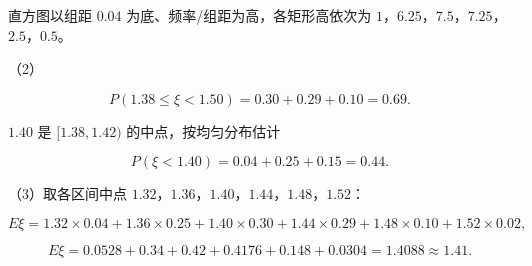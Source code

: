 \begin{answer}
直方图以组距 $0.04$ 为底、频率/组距为高，各矩形高依次为 $1$，$6.25$，$7.5$，$7.25$，$2.5$，$0.5$。

（2）

\nopagebreak[4]
\[P(1.38\leqslant\xi<1.50)=0.30+0.29+0.10=0.69.\]

$1.40$ 是 $[1.38,1.42)$ 的中点，按均匀分布估计

\nopagebreak[4]
\[P(\xi<1.40)=0.04+0.25+0.15=0.44.\]

（3）取各区间中点 $1.32$，$1.36$，$1.40$，$1.44$，$1.48$，$1.52$：

\nopagebreak[4]
\[E\xi=1.32\times0.04+1.36\times0.25+1.40\times0.30+1.44\times0.29+1.48\times0.10+1.52\times0.02,\]

\nopagebreak[4]
\[E\xi=0.0528+0.34+0.42+0.4176+0.148+0.0304=1.4088\approx1.41.\]


\end{answer}
